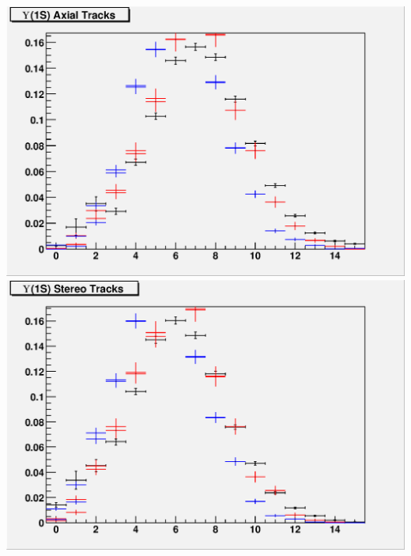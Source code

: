 \documentclass[12pt]{article}
\begin{document}
\includegraphics[width=\linewidth]{trigger1_trax.eps}
\vfill
\includegraphics[width=\linewidth]{trigger1_trst.eps}
\end{document}
